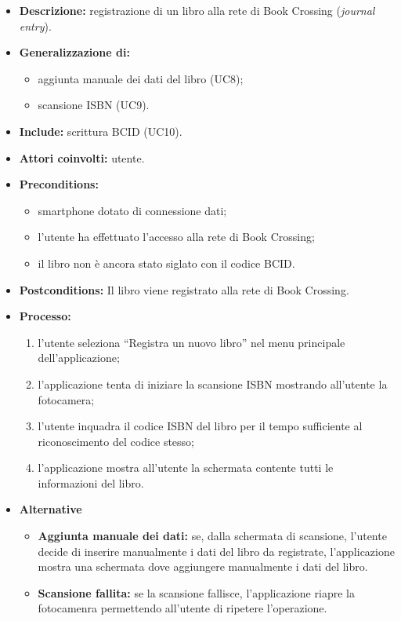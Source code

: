 \begin{itemize}
	\begin{itemize}
		\item \textbf{Descrizione:} registrazione di un libro alla rete di Book Crossing (\textit{journal entry}).
		\item \textbf{Generalizzazione di:} 
		\begin{itemize}
			\item aggiunta manuale dei dati del libro (UC8);
			\item scansione ISBN (UC9).
		\end{itemize}
		\item \textbf{Include:} scrittura BCID (UC10).
		\item \textbf{Attori coinvolti:} utente.
		\item \textbf{Preconditions:}
		\begin{itemize}
			\item smartphone dotato di connessione dati;
			\item l’utente ha effettuato l’accesso alla rete di Book Crossing;
			\item il libro non è ancora stato siglato con il codice BCID.
		\end{itemize}
		\item \textbf{Postconditions:} Il libro viene registrato alla rete di Book Crossing.		
		\item \textbf{Processo:} 
		\begin{enumerate}
			\item l’utente seleziona “Registra un nuovo libro” nel menu principale dell’applicazione;
			\item l’applicazione tenta di iniziare la scansione ISBN mostrando all'utente la fotocamera;
			\item l’utente inquadra il codice ISBN del libro per il tempo sufficiente al riconoscimento del codice stesso;
			\item l’applicazione mostra all'utente la schermata contente tutti le informazioni del libro.
		\end{enumerate}
		\item \textbf{Alternative}
		\begin{itemize}
			\item \textbf{Aggiunta manuale dei dati:} se, dalla schermata di scansione, l'utente decide di inserire manualmente i dati del libro da registrate, l'applicazione mostra una schermata dove aggiungere manualmente i dati del libro.
			\item \textbf{Scansione fallita:} se la scansione fallisce, l'applicazione riapre la fotocamenra permettendo all'utente di ripetere l'operazione.

\end{itemize}
\end{itemize}
\end{itemize}
